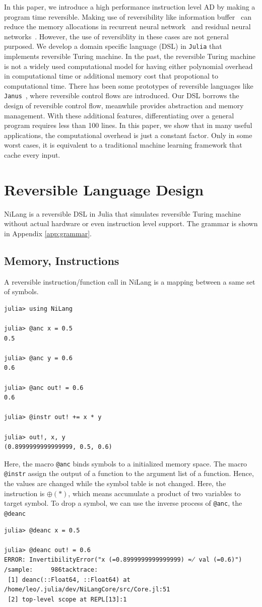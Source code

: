 \documentclass{article}
\newcommand{\<}{\langle}
\renewcommand{\>}{\rangle}
\newcommand{\App}[1]{Appendix \ref{#1}}
\begin{document}
In this paper, we introduce a high performance instruction level AD by making a program time reversible.
Making use of reversibility like information buffer~\cite{Maclaurin2015} can reduce the memory allocations in recurrent neural network~\cite{MacKay2018} and residual neural networks~\cite{Behrmann2018}. However, the use of reversiblity in these cases are not general purposed.
We develop a domain specific language (DSL) in \texttt{Julia} that implements reversible Turing machine. In the past, the reversible Turing machine is not a widely used computational model for having either polynomial overhead in computational time or additional memory cost that propotional to computational time.
There has been some prototypes of reversible languages like \texttt{Janus}~\cite{Lutz1986}, where reversible control flows are introduced. Our DSL borrows the design of reversible control flow, meanwhile provides abstraction and memory management. With these additional features, differentiating over a general program requires less than 100 lines.
In this paper, we show that in many useful applications, the computational overhead is just a constant factor. Only in some worst cases, it is equivalent to a traditional machine learning framework that cache every input.

\section{Reversible Language Design}
NiLang is a reversible DSL in Julia that simulates reversible Turing machine without actual hardware or even instruction level support. The grammar is shown in \App{app:grammar}.
\subsection{Memory, Instructions}
A reversible instruction/function call in NiLang is a mapping between a same set of symbols.
\begin{lstlisting}
julia> using NiLang

julia> @anc x = 0.5
0.5

julia> @anc y = 0.6
0.6

julia> @anc out! = 0.6
0.6

julia> @instr out! += x * y

julia> out!, x, y
(0.8999999999999999, 0.5, 0.6)
\end{lstlisting}
Here, the macro \texttt{@anc} binds symbols to a initialized memory space. The macro \texttt{@instr} assign the output of a function to the argument list of a function. Hence, the values are changed while the symbol table is not changed. Here, the instruction is $\oplus(*)$, which means accumulate a product of two variables to target symbol.
To drop a symbol, we can use the inverse process of \texttt{@anc}, the \texttt{@deanc}
\begin{lstlisting}
julia> @deanc x = 0.5

julia> @deanc out! = 0.6
ERROR: InvertibilityError("x (=0.8999999999999999) ≂̸ val (=0.6)")
/sample:     986tacktrace:
 [1] deanc(::Float64, ::Float64) at /home/leo/.julia/dev/NiLangCore/src/Core.jl:51
 [2] top-level scope at REPL[13]:1
\end{lstlisting}
\end{document}
